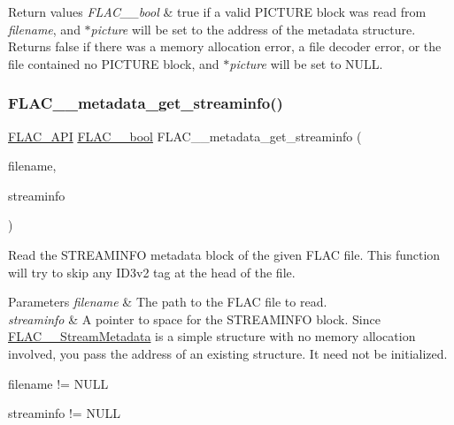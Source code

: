 \begin{DoxyRetVals}{Return values}
{\em F\+L\+A\+C\+\_\+\+\_\+bool} & {\ttfamily true} if a valid P\+I\+C\+T\+U\+RE block was read from {\itshape filename}, and {\itshape $\ast$picture} will be set to the address of the metadata structure. Returns {\ttfamily false} if there was a memory allocation error, a file decoder error, or the file contained no P\+I\+C\+T\+U\+RE block, and {\itshape $\ast$picture} will be set to {\ttfamily N\+U\+LL}. \\
\hline
\end{DoxyRetVals}
\mbox{\label{group__flac__metadata__level0_gaf248d1ccc8025b9e9d7f532b8af4ab07}} 
\subsubsection{\texorpdfstring{F\+L\+A\+C\+\_\+\+\_\+metadata\+\_\+get\+\_\+streaminfo()}{FLAC\_\_metadata\_get\_streaminfo()}}
{\footnotesize\ttfamily \hyperlink{group__flac__export_ga56ca07df8a23310707732b1c0007d6f5}{F\+L\+A\+C\+\_\+\+A\+PI} \hyperlink{ordinals_8h_a95103469f1cbd78b8cf250194985b34e}{F\+L\+A\+C\+\_\+\+\_\+bool} F\+L\+A\+C\+\_\+\+\_\+metadata\+\_\+get\+\_\+streaminfo (\begin{DoxyParamCaption}\item[{\hyperlink{zconf_8h_a2c212835823e3c54a8ab6d95c652660e}{const} char $\ast$}]{filename,  }\item[{\hyperlink{struct_f_l_a_c_____stream_metadata}{F\+L\+A\+C\+\_\+\+\_\+\+Stream\+Metadata} $\ast$}]{streaminfo }\end{DoxyParamCaption})}

Read the S\+T\+R\+E\+A\+M\+I\+N\+FO metadata block of the given F\+L\+AC file. This function will try to skip any I\+D3v2 tag at the head of the file.


\begin{DoxyParams}{Parameters}
{\em filename} & The path to the F\+L\+AC file to read. \\
\hline
{\em streaminfo} & A pointer to space for the S\+T\+R\+E\+A\+M\+I\+N\+FO block. Since \hyperlink{struct_f_l_a_c_____stream_metadata}{F\+L\+A\+C\+\_\+\+\_\+\+Stream\+Metadata} is a simple structure with no memory allocation involved, you pass the address of an existing structure. It need not be initialized.  
\begin{DoxyCode}
filename != NULL 
\end{DoxyCode}
 
\begin{DoxyCode}
streaminfo != NULL 
\end{DoxyCode}
 \\
\hline
\end{DoxyParams}


